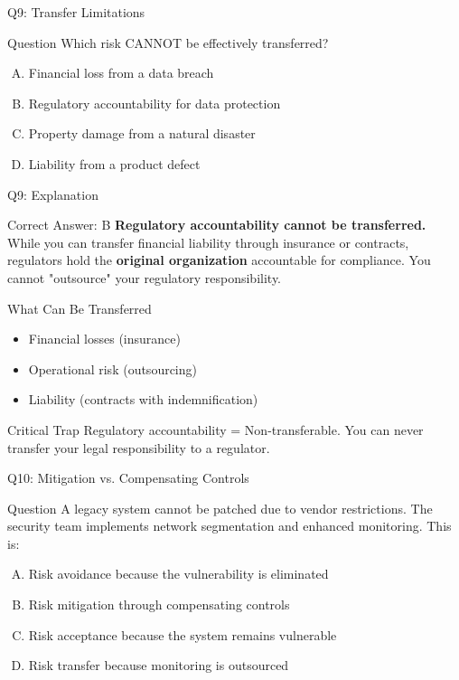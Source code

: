 \documentclass{beamer}
\begin{document}
	\begin{frame}{Q9: Transfer Limitations}
		\begin{block}{Question}
			Which risk CANNOT be effectively transferred?
		\end{block}
		\begin{enumerate}[(A)]
			\item Financial loss from a data breach
			\item Regulatory accountability for data protection
			\item Property damage from a natural disaster
			\item Liability from a product defect
		\end{enumerate}
	\end{frame}
	
	\begin{frame}{Q9: Explanation}
		\begin{block}{Correct Answer: B}
			\textbf{Regulatory accountability cannot be transferred.} While you can transfer financial liability through insurance or contracts, regulators hold the \textbf{original organization} accountable for compliance. You cannot "outsource" your regulatory responsibility.
		\end{block}
		\begin{block}{What Can Be Transferred}
			\begin{itemize}
				\item Financial losses (insurance)
				\item Operational risk (outsourcing)
				\item Liability (contracts with indemnification)
			\end{itemize}
		\end{block}
		\begin{alertblock}{Critical Trap}
			Regulatory accountability = Non-transferable.
			You can never transfer your legal responsibility to a regulator.
		\end{alertblock}
	\end{frame}
	
	\begin{frame}{Q10: Mitigation vs. Compensating Controls}
		\begin{block}{Question}
			A legacy system cannot be patched due to vendor restrictions. The security team implements network segmentation and enhanced monitoring. This is:
		\end{block}
		\begin{enumerate}[(A)]
			\item Risk avoidance because the vulnerability is eliminated
			\item Risk mitigation through compensating controls
			\item Risk acceptance because the system remains vulnerable
			\item Risk transfer because monitoring is outsourced
		\end{enumerate}
	\end{frame}
	
\end{document}
